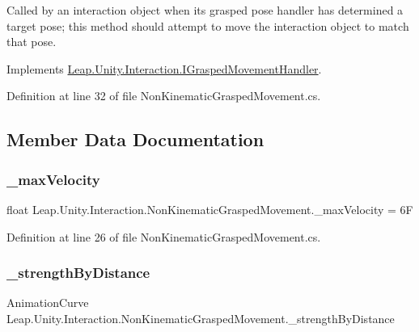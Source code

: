 Called by an interaction object when its grasped pose handler has determined a target pose; this method should attempt to move the interaction object to match that pose. 



Implements \mbox{\hyperlink{interface_leap_1_1_unity_1_1_interaction_1_1_i_grasped_movement_handler_a49da4845ba5c20aa1ff075745b634c78}{Leap.\+Unity.\+Interaction.\+I\+Grasped\+Movement\+Handler}}.



Definition at line 32 of file Non\+Kinematic\+Grasped\+Movement.\+cs.



\subsection{Member Data Documentation}
\mbox{\label{class_leap_1_1_unity_1_1_interaction_1_1_non_kinematic_grasped_movement_a7f5c311f0900813b68eda7b459683cb0}} 
\subsubsection{\texorpdfstring{\_maxVelocity}{\_maxVelocity}}
{\footnotesize\ttfamily float Leap.\+Unity.\+Interaction.\+Non\+Kinematic\+Grasped\+Movement.\+\_\+max\+Velocity = 6F\hspace{0.3cm}{\ttfamily [protected]}}



Definition at line 26 of file Non\+Kinematic\+Grasped\+Movement.\+cs.

\mbox{\label{class_leap_1_1_unity_1_1_interaction_1_1_non_kinematic_grasped_movement_af5bfd871019106e6640b6d2cd050d72a}} 
\subsubsection{\texorpdfstring{\_strengthByDistance}{\_strengthByDistance}}
{\footnotesize\ttfamily Animation\+Curve Leap.\+Unity.\+Interaction.\+Non\+Kinematic\+Grasped\+Movement.\+\_\+strength\+By\+Distance\hspace{0.3cm}{\ttfamily [protected]}}

